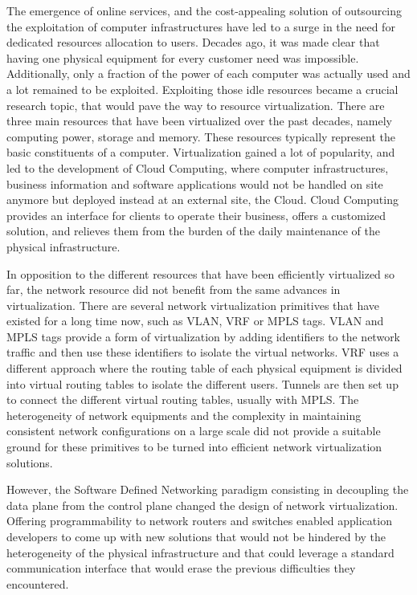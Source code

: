 The emergence of online services, and the cost-appealing solution of outsourcing the exploitation of computer infrastructures have led to a surge in the need for dedicated resources allocation to users. Decades ago, it was made clear that having one physical equipment for every customer need was impossible. Additionally, only a fraction of the power of each computer was actually used and a lot remained to be exploited.
Exploiting those idle resources became a crucial research topic, that would pave the way to resource virtualization. 
There are three main resources that have been virtualized over the past decades, namely computing power, storage and memory.
These resources typically represent the basic constituents of a computer.
Virtualization gained a lot of popularity, and led to the development of Cloud Computing, where computer infrastructures, business information and software applications would not be handled on site anymore but deployed instead at an external site, \ie the Cloud. 
Cloud Computing provides an interface for clients to operate their business, offers a customized solution, and relieves them from the burden of the daily maintenance of the physical infrastructure.

In opposition to the different resources that have been efficiently virtualized so far, the network resource did not benefit from the same advances in virtualization.
There are several network virtualization primitives that have existed for a long time now, such as VLAN, VRF or MPLS tags. VLAN and MPLS tags provide a form of virtualization by adding identifiers to the network traffic and then use these identifiers to isolate the virtual networks. VRF uses a different approach where the routing table of each physical equipment is divided into virtual routing tables to isolate the different users. Tunnels are then set up to connect the different virtual routing tables, usually with MPLS.
The heterogeneity of network equipments and the complexity in maintaining consistent network configurations on a large scale did not provide a suitable ground for these primitives to be turned into efficient network virtualization solutions.

However, the Software Defined Networking paradigm consisting in decoupling the data plane from the control plane changed the design of network virtualization. Offering programmability to network routers and switches enabled application developers to come up with new solutions that would not be hindered by the heterogeneity of the physical infrastructure and that could leverage a standard communication interface that would erase the previous difficulties they encountered.


